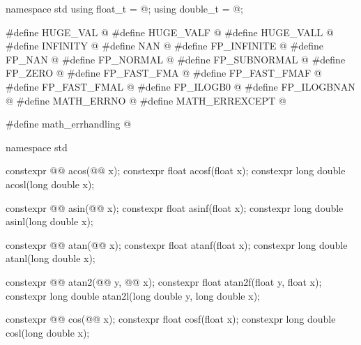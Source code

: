 %
%
%
%
%
%
%
%
%
%
%
%
%
%
%
%
%
%
%
%
%
%
%
%
%
%
\begin{codeblock}
namespace std {
  using float_t = @\seebelow@;
  using double_t = @\seebelow@;
}

#define HUGE_VAL @\seebelow@
#define HUGE_VALF @\seebelow@
#define HUGE_VALL @\seebelow@
#define INFINITY @\seebelow@
#define NAN @\seebelow@
#define FP_INFINITE @\seebelow@
#define FP_NAN @\seebelow@
#define FP_NORMAL @\seebelow@
#define FP_SUBNORMAL @\seebelow@
#define FP_ZERO @\seebelow@
#define FP_FAST_FMA @\seebelow@
#define FP_FAST_FMAF @\seebelow@
#define FP_FAST_FMAL @\seebelow@
#define FP_ILOGB0 @\seebelow@
#define FP_ILOGBNAN @\seebelow@
#define MATH_ERRNO @\seebelow@
#define MATH_ERREXCEPT @\seebelow@

#define math_errhandling @\seebelow@

namespace std {
  constexpr @@ acos(@@ x);
  constexpr float acosf(float x);
  constexpr long double acosl(long double x);

  constexpr @@ asin(@@ x);
  constexpr float asinf(float x);
  constexpr long double asinl(long double x);

  constexpr @@ atan(@@ x);
  constexpr float atanf(float x);
  constexpr long double atanl(long double x);

  constexpr @@ atan2(@@ y, @@ x);
  constexpr float atan2f(float y, float x);
  constexpr long double atan2l(long double y, long double x);

  constexpr @@ cos(@@ x);
  constexpr float cosf(float x);
  constexpr long double cosl(long double x);

}
\end{codeblock}
